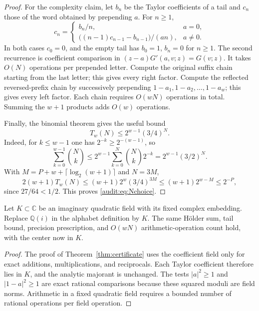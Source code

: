 \begin{proof}
For the complexity claim, let $b_n$ be the Taylor coefficients of a
tail and $c_n$ those of the word obtained by prepending $a$. For $n\geq1$,
\begin{equation}\label{audit:eq:recurrence}
 c_n=
 \begin{cases}
   b_n/n,&a=0,\\
   \bigl((n-1)c_{n-1}-b_{n-1}\bigr)/(an),&a\ne0.
 \end{cases}
\end{equation}
In both cases $c_0=0$, and the empty tail has $b_0=1$, $b_n=0$ for
$n\geq1$. The second recurrence is coefficient comparison in
$(z-a)G'(a,v;z)=G(v;z)$.
It takes $O(N)$ operations per prepended letter. Compute the original
suffix chain starting from the last letter; this gives every right
factor. Compute the reflected reversed-prefix chain by successively
prepending $1-a_1,1-a_2,\ldots,1-a_w$; this gives every left factor.
Each chain requires $O(wN)$ operations in total. Summing the $w+1$
products adds $O(w)$ operations.

Finally, the binomial theorem gives the useful bound
\[
 T_w(N)\leq 2^{w-1}(3/4)^N.
\]
Indeed, for $k\leq w-1$ one has $2^{-k}\geq2^{-(w-1)}$, so
\[
 \sum_{k=0}^{w-1}\binom Nk
 \leq2^{w-1}\sum_{k=0}^N\binom Nk2^{-k}
 =2^{w-1}(3/2)^N.
\]
With $M=P+w+\lceil\log_2(w+1)\rceil$ and $N=3M$,
\[
 2(w+1)T_w(N)
 \leq(w+1)2^w(3/4)^{3M}
 \leq(w+1)2^{w-M}\leq2^{-P},
\]
since $27/64<1/2$. This proves \eqref{audit:eq:Nchoice}.
\end{proof}

\begin{corollary}
\label{cor:quadratic-certificate}
Let $K\subset\mathbb C$ be an imaginary quadratic field with its fixed
complex embedding. Replace $\mathbb Q(i)$ in the alphabet definition by
$K$. The same H\"older sum, tail bound, precision prescription, and
$O(wN)$ arithmetic-operation count hold, with the center now in $K$.
\end{corollary}
\begin{proof}
The proof of Theorem~\ref{thm:certificate} uses the coefficient field
only for exact additions, multiplications, and reciprocals. Each
Taylor coefficient therefore lies in $K$, and the analytic majorant
is unchanged. The tests $|a|^2\ge1$ and $|1-a|^2\ge1$ are exact
rational comparisons because these squared moduli are field norms.
Arithmetic in a fixed quadratic field requires a bounded number of
rational operations per field operation.
\end{proof}

